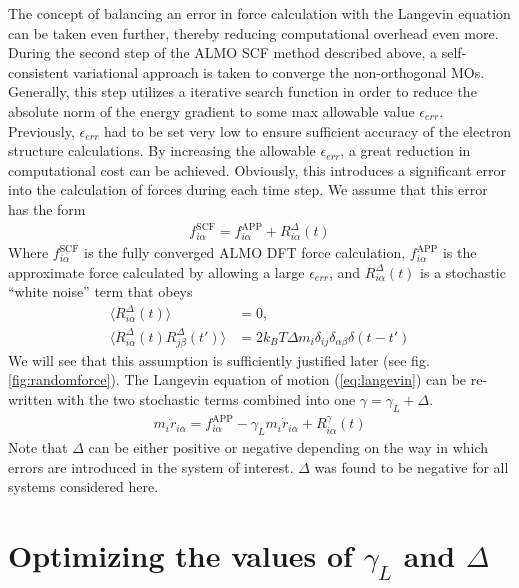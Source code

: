 \documentclass[10pt,aps,prl,twocolumn,amsmath,amssymb,superscriptaddress,longbibliography]{revtex4-1}
\begin{document}
The concept of balancing an error in force calculation with the Langevin equation can be taken even further, thereby reducing computational overhead even more. 
During the second step of the ALMO SCF method described above, a self-consistent variational approach is taken to converge the non-orthogonal MOs. 
Generally, this step utilizes a iterative search function in order to reduce the absolute norm of the energy gradient to some max allowable value $\epsilon_{err}$. 
Previously, $\epsilon_{err}$ had to be set very low to ensure sufficient accuracy of the electron structure calculations. 
By increasing the allowable $\epsilon_{err}$, a great reduction in computational cost can be achieved. 
Obviously, this introduces a significant error into the calculation of forces during each time step. 
We assume that this error has the form
%
\begin{align}
\label{eq:assumption}
f^{\text{SCF}}_{i\alpha} = f^{\text{APP}}_{i\alpha} + R^{\Delta}_{i\alpha} (t)
\end{align}
%
Where $f^{\text{SCF}}_{i\alpha}$ is the fully converged ALMO DFT force calculation, $f^{\text{APP}}_{i\alpha}$ is the approximate force calculated by allowing a large $\epsilon_{err}$, and $R^{\Delta}_{i\alpha} (t)$ is a stochastic ``white noise'' term that obeys
%
\begin{align}
\label{eq:stochastic2}
\langle R^{\Delta}_{i\alpha} (t) \rangle &= 0, \\
\label{eq:stochastic3}
\langle R^{\Delta}_{i\alpha} (t)  R^{\Delta}_{j\beta} (t') \rangle &= 2 k_B T \Delta m_i \delta_{ij} \delta_{\alpha\beta} \delta(t-t')
\end{align}
%
We will see that this assumption is sufficiently justified later (see fig. \ref{fig:randomforce}). 
The Langevin equation of motion (\ref{eq:langevin}) can be re-written with the two stochastic terms combined into one $\gamma = \gamma_L+\Delta$.
%
\begin{align}
\label{eq:langevin2}
m_i \ddot{r}_{i\alpha} = f^{\text{APP}}_{i\alpha} - \gamma_L m_i \dot{r}_{i\alpha} + R^{\gamma}_{i\alpha} (t)
\end{align}
%
Note that $\Delta$ can be either positive or negative depending on the way in which errors are introduced in the system of interest. 
$\Delta$ was found to be negative for all systems considered here.

\section{Optimizing the values of $\gamma_L$ and $\Delta$}
\end{document}
